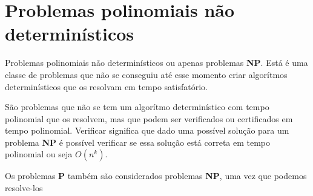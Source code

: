 \section{Problemas polinomiais não determinísticos}
Problemas polinomiais não determinísticos ou apenas problemas \textbf{NP}. Está é uma classe de problemas que não se conseguiu até esse momento criar algorítmos determinísticos que os resolvam em tempo satisfatório.

São problemas que não se tem um algorítmo determinístico com tempo polinomial que os resolvem, mas que podem ser verificados ou certificados em tempo polinomial. Verificar significa que dado uma possível solução para um problema \textbf{NP} é possível verificar se essa solução está correta em tempo polinomial ou seja $O(n^k)$.

Os problemas \textbf{P} também são considerados problemas \textbf{NP}, uma vez que podemos resolve-los 
